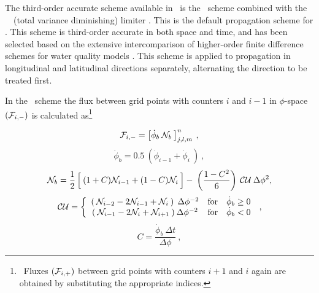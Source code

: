 
\vspace{\baselineskip}
\vspace{\baselineskip} 


\noindent 
The third-order accurate scheme available in \ws\ is the \qck\ scheme
\citep{art:Leo79,art:DM82} combined with the \ult\ \tvd\ (total variance
diminishing) limiter \citep{art:Leo91}. This is the default propagation scheme
for \ws. This scheme is third-order accurate in both space and time, and has
been selected based on the extensive intercomparison of higher-order finite
difference schemes for water quality models 
\citep[see][]{PhD:Cah,pro:FC93,tol:OMB95}. This scheme is applied to
propagation in longitudinal and latitudinal directions separately, alternating
the direction to be treated first.

In the \qck\ scheme the flux between grid points with counters $i$ and $i-1$
in $\phi$-space $({\cal F}_{i,-})$ is calculated as\footnote{~Fluxes $({\cal F}_{i,+})$
between grid points with counters $i+1$ and $i$ again are obtained by
substituting the appropriate indices.}


\begin{equation}
\cF_{i,-} = \left [ \dot{\phi}_b \: \cN_b \: \right ]^n_{j,l,m} \: , \label{eq:quick_1}
\end{equation} \begin{equation}
\dot{\phi}_b = 0.5 \: \left ( \dot{\phi}_{i-1} + \dot{\phi}_i 
\: \right ) \: , \label{eq:quick_1a}
\end{equation}  \begin{equation}
\cN_b = \frac{1}{2} \left [ \rule[0mm]{0mm}{\baselineskip} \: 
(1+C)\cN_{i-1} + (1-C)\cN_i \: \right ] - \:
\left ( \frac{1-C^2}{6} \right ) \: {\cal CU} \: \Delta\phi^2, \label{eq:quick_2} \end{equation} \begin{equation}
{\cal CU} =  \left \{ \begin{array}{ccc}
(\: \cN_{i-2} - 2\cN_{i-1} + \cN_{i} \:)\: \: \Delta \phi^{-2}
               & \mbox{for} & \dot{\phi}_b \geq 0 \\
(\: \cN_{i-1} - 2\cN_{i} + \cN_{i+1} \:)\: \Delta \phi^{-2}
               & \mbox{for} & \dot{\phi}_b   <  0
\end{array} \right . \: , \label{eq:quick_3}
\end{equation} \begin{equation}
C = \frac{\dot{\phi}_b \: \Delta t}{\Delta \phi} 
\: , \label{eq:quick_4} \end{equation}

